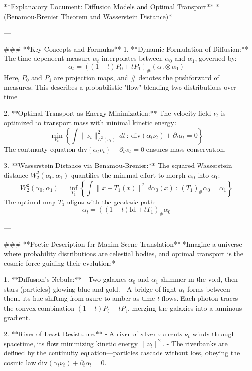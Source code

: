 **Explanatory Document: Diffusion Models and Optimal Transport**  
*(Benamou-Brenier Theorem and Wasserstein Distance)*  

---

### **Key Concepts and Formulas**  
1. **Dynamic Formulation of Diffusion:**  
   The time-dependent measure \( \alpha_t \) interpolates between \( \alpha_0 \) and \( \alpha_1 \), governed by:  
   \[
   \alpha_t = \left( (1 - t)P_0 + tP_1 \right)_\# (\alpha_0 \otimes \alpha_1)
   \]  
   Here, \( P_0 \) and \( P_1 \) are projection maps, and \( \# \) denotes the pushforward of measures. This describes a probabilistic "flow" blending two distributions over time.  

2. **Optimal Transport as Energy Minimization:**  
   The velocity field \( \nu_t \) is optimized to transport mass with minimal kinetic energy:  
   \[
   \min_{\nu_t} \left\{ \int \|\nu_t\|_{L^2(\alpha_t)}^2 \, dt \ : \ \text{div}(\alpha_t \nu_t) + \partial_t \alpha_t = 0 \right\}
   \]  
   The continuity equation \( \text{div}(\alpha_t \nu_t) + \partial_t \alpha_t = 0 \) ensures mass conservation.  

3. **Wasserstein Distance via Benamou-Brenier:**  
   The squared Wasserstein distance \( W_2^2(\alpha_0, \alpha_1) \) quantifies the minimal effort to morph \( \alpha_0 \) into \( \alpha_1 \):  
   \[
   W_2^2(\alpha_0, \alpha_1) = \inf_{T_1} \left\{ \int \|x - T_1(x)\|^2 \, d\alpha_0(x) \ : \ (T_1)_\# \alpha_0 = \alpha_1 \right\}
   \]  
   The optimal map \( T_1 \) aligns with the geodesic path:  
   \[
   \alpha_t = \left( (1 - t)\text{Id} + tT_1 \right)_\# \alpha_0
   \]  

---

### **Poetic Description for Manim Scene Translation**  
*Imagine a universe where probability distributions are celestial bodies, and optimal transport is the cosmic force guiding their evolution:*  

1. **Diffusion’s Nebula:**  
   - Two galaxies \( \alpha_0 \) and \( \alpha_1 \) shimmer in the void, their stars (particles) glowing blue and gold.  
   - A bridge of light \( \alpha_t \) forms between them, its hue shifting from azure to amber as time \( t \) flows. Each photon traces the convex combination \( (1 - t)P_0 + tP_1 \), merging the galaxies into a luminous gradient.  

2. **River of Least Resistance:**  
   - A river of silver currents \( \nu_t \) winds through spacetime, its flow minimizing kinetic energy \( \|\nu_t\|^2 \).  
   - The riverbanks are defined by the continuity equation—particles cascade without loss, obeying the cosmic law \( \text{div}(\alpha_t \nu_t) + \partial_t \alpha_t = 0 \).  

